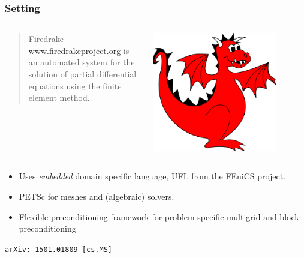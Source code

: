 \documentclass[presentation,aspectratio=43, 10pt]{beamer}
\newcommand{\arxivlink}[2]{{\texttt{arXiv:\,\href{https://arxiv.org/abs/#1}{#1\,[#2]}}}}
\begin{document}
\begin{frame}[t]
  \frametitle{Setting}

  \begin{columns}
    \begin{column}{0.8\textwidth}
      \begin{quote}
        Firedrake \url{www.firedrakeproject.org} {\normalfont
          [\ldots]} is an automated system for the solution of
        partial differential equations using the finite element
        method.
      \end{quote}
    \end{column}
    \begin{column}{0.2\textwidth}
      \includegraphics[width=0.8\textwidth]{firedrake}
    \end{column}
  \end{columns}
  \begin{itemize}
  \item Uses \emph{embedded} domain specific language, UFL
    \parencite{Alnaes:2014} from the FEniCS project.
  \item PETSc for meshes and (algebraic) solvers.
  \item \alert{Flexible preconditioning framework for problem-specific
    multigrid and block preconditioning}
  \end{itemize}

  {\raggedleft
    \scriptsize \textcite{Rathgeber:2016} \arxivlink{1501.01809}{cs.MS}\par}
\end{frame}
\end{document}

